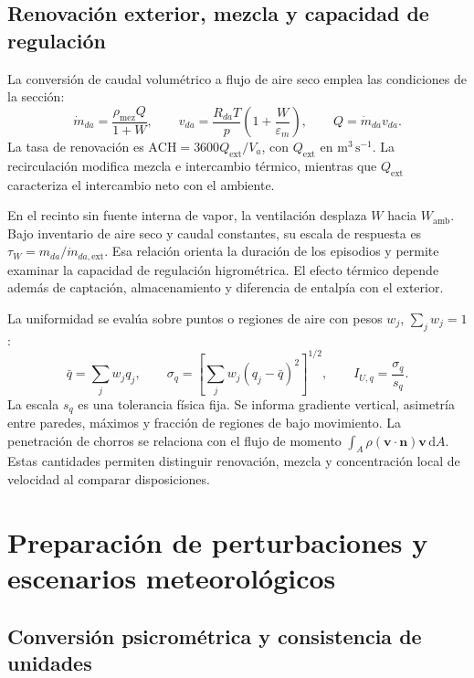 \subsection{Renovación exterior, mezcla y capacidad de regulación}

La conversión de caudal volumétrico a flujo de aire seco emplea las condiciones de la sección:
\begin{equation}
\dot m_{da}=\frac{\rho_{\mathrm{mez}}Q}{1+W},\qquad
v_{da}=\frac{R_{da}T}{p}\left(1+\frac{W}{\varepsilon_m}\right),\qquad
Q=\dot m_{da}v_{da}.
\label{met:conversion_caudal}
\end{equation}
La tasa de renovación es $\mathrm{ACH}=3600Q_{\mathrm{ext}}/V_a$, con $Q_{\mathrm{ext}}$ en $\mathrm{m^3\,s^{-1}}$. La recirculación modifica mezcla e intercambio térmico, mientras que $Q_{\mathrm{ext}}$ caracteriza el intercambio neto con el ambiente.

En el recinto sin fuente interna de vapor, la ventilación desplaza $W$ hacia $W_{\mathrm{amb}}$. Bajo inventario de aire seco y caudal constantes, su escala de respuesta es $\tau_W=m_{da}/\dot m_{da,\mathrm{ext}}$. Esa relación orienta la duración de los episodios y permite examinar la capacidad de regulación higrométrica. El efecto térmico depende además de captación, almacenamiento y diferencia de entalpía con el exterior.

La uniformidad se evalúa sobre puntos o regiones de aire con pesos $w_j$, $\sum_jw_j=1$:
\begin{equation}
\bar q=\sum_jw_jq_j,\qquad
\sigma_q=\left[\sum_jw_j(q_j-\bar q)^2\right]^{1/2},\qquad
I_{U,q}=\frac{\sigma_q}{s_q}.
\label{met:dispersion_espacial}
\end{equation}
La escala $s_q$ es una tolerancia física fija. Se informa gradiente vertical, asimetría entre paredes, máximos y fracción de regiones de bajo movimiento. La penetración de chorros se relaciona con el flujo de momento $\int_A\rho(\mathbf v\cdot\mathbf n)\mathbf v\,\mathrm dA$. Estas cantidades permiten distinguir renovación, mezcla y concentración local de velocidad al comparar disposiciones.
\FloatBarrier

\section{Preparación de perturbaciones y escenarios meteorológicos}
\label{met:meteorologia}

\subsection{Conversión psicrométrica y consistencia de unidades}

